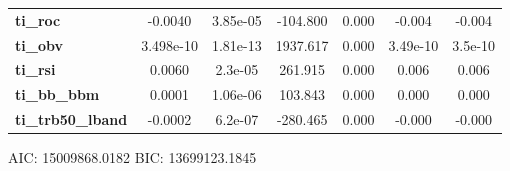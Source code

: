 \begin{center}
\begin{tabular}{lcccccc}
\textbf{ti\_roc}            &      -0.0040  &     3.85e-05     &  -104.800  &         0.000        &       -0.004    &       -0.004     \\
\textbf{ti\_obv}            &    3.498e-10  &     1.81e-13     &  1937.617  &         0.000        &     3.49e-10    &      3.5e-10     \\
\textbf{ti\_rsi}            &       0.0060  &      2.3e-05     &   261.915  &         0.000        &        0.006    &        0.006     \\
\textbf{ti\_bb\_bbm}        &       0.0001  &     1.06e-06     &   103.843  &         0.000        &        0.000    &        0.000     \\
\textbf{ti\_trb50\_lband}   &      -0.0002  &      6.2e-07     &  -280.465  &         0.000        &       -0.000    &       -0.000     \\
\bottomrule
\end{tabular}
\end{center}

AIC: 15009868.0182 BIC: 13699123.1845

